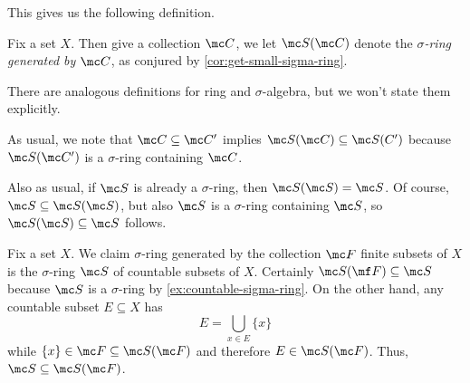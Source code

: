 \documentclass[../notes.tex]{subfiles}
\begin{document}
This gives us the following definition.
\begin{defihelper} 
	Fix a set $X$. Then give a collection $\mc C$, we let $\mc S(\mc C)$ denote the \textit{$\sigma$-ring generated by $\mc C$}, as conjured by \autoref{cor:get-small-sigma-ring}.
\end{defihelper}
There are analogous definitions for ring and $\sigma$-algebra, but we won't state them explicitly.
\begin{remark}
	As usual, we note that $\mc C\subseteq\mc C'$ implies $\mc S(\mc C)\subseteq\mc S(C')$ because $\mc S(\mc C')$ is a $\sigma$-ring containing $\mc C$.
\end{remark}
\begin{remark}
	Also as usual, if $\mc S$ is already a $\sigma$-ring, then $\mc S(\mc S)=\mc S$. Of course, $\mc S\subseteq\mc S(\mc S)$, but also $\mc S$ is a $\sigma$-ring containing $\mc S$, so $\mc S(\mc S)\subseteq\mc S$ follows.
\end{remark}
\begin{example}
	Fix a set $X$. We claim $\sigma$-ring generated by the collection $\mc F$ finite subsets of $X$ is the $\sigma$-ring $\mc S$ of countable subsets of $X$. Certainly $\mc S(\mf F)\subseteq\mc S$ because $\mc S$ is a $\sigma$-ring by \autoref{ex:countable-sigma-ring}. On the other hand, any countable subset $E\subseteq X$ has
	\[E=\bigcup_{x\in E}\{x\}\]
	while $\{x\}\in\mc F\subseteq\mc S(\mc F)$ and therefore $E\in\mc S(\mc F)$. Thus, $\mc S\subseteq\mc S(\mc F)$.
\end{example}
\end{document}
